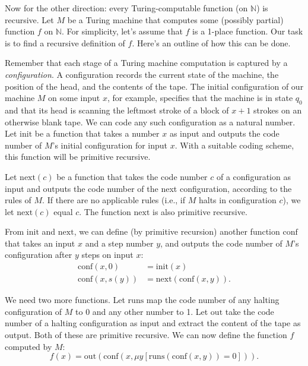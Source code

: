 
Now for the other direction:
every Turing-computable function (on $\mathbb{N}$) is recursive.
Let $M$ be a Turing machine that computes some (possibly partial) function $f$ on $\mathbb{N}$.
For simplicity, let's assume that $f$ is a 1-place function.
Our task is to find a recursive definition of $f$.
Here's an outline of how this can be done.

Remember that each stage of a Turing machine computation is captured by a \emph{configuration}.
A configuration records
the current state of the machine,
the position of the head, and
the contents of the tape.
The initial configuration of our machine $M$ on some input $x$,
for example,
specifies that the machine is in state $q_0$
and that its head is scanning the leftmost stroke of a block of $x\!+\!1$ strokes on an otherwise blank tape.
We can code any such configuration as a natural number.
Let $\mathrm{init}$ be a function that
takes a number $x$ as input and
outputs the code number of $M$'s initial configuration for input $x$.
With a suitable coding scheme,
this function will be primitive recursive.

Let $\mathrm{next}(c)$ be a function that
takes the code number $c$ of a configuration as input
and outputs the code number of the next configuration,
according to the rules of $M$.
If there are no applicable rules (i.e., if $M$ halts in configuration $c$),
we let $\mathrm{next}(c)$ equal $c$.
The function $\mathrm{next}$ is also primitive recursive.

From $\mathrm{init}$ and $\mathrm{next}$,
we can define (by primitive recursion) another function $\mathrm{conf}$ that
takes an input $x$ and a step number $y$,
and outputs the code number of $M$'s configuration after $y$ steps on input $x$:
\begin{align*}
  \mathrm{conf}(x,0) &= \mathrm{init}(x)\\
  \mathrm{conf}(x,s(y)) &= \mathrm{next}(\mathrm{conf}(x,y)).
\end{align*}

We need two more functions.
Let $\mathrm{runs}$ map the code number of any halting configuration of $M$ to 0
and any other number to 1.
Let $\mathrm{out}$ take the code number of a halting configuration as input and
extract the content of the tape as output.
Both of these are primitive recursive.
We can now define the function $f$ computed by $M$:
\[
  f(x) = \mathrm{out}(\mathrm{conf}(x, \mu y[\mathrm{runs}(\mathrm{conf}(x,y))=0])).
\]


